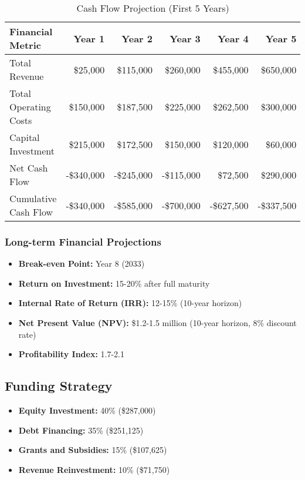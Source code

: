 \begin{table}[h]
\centering
\begin{tabular}{|l|r|r|r|r|r|}
\hline
\textbf{Financial Metric} & \textbf{Year 1} & \textbf{Year 2} & \textbf{Year 3} & \textbf{Year 4} & \textbf{Year 5} \\
\hline
Total Revenue & \$25,000 & \$115,000 & \$260,000 & \$455,000 & \$650,000 \\
Total Operating Costs & \$150,000 & \$187,500 & \$225,000 & \$262,500 & \$300,000 \\
Capital Investment & \$215,000 & \$172,500 & \$150,000 & \$120,000 & \$60,000 \\
\hline
Net Cash Flow & -\$340,000 & -\$245,000 & -\$115,000 & \$72,500 & \$290,000 \\
Cumulative Cash Flow & -\$340,000 & -\$585,000 & -\$700,000 & -\$627,500 & -\$337,500 \\
\hline
\end{tabular}
\caption{Cash Flow Projection (First 5 Years)}
\end{table}

\subsubsection{Long-term Financial Projections}
\begin{itemize}
    \item \textbf{Break-even Point:} Year 8 (2033)
    \item \textbf{Return on Investment:} 15-20\% after full maturity
    \item \textbf{Internal Rate of Return (IRR):} 12-15\% (10-year horizon)
    \item \textbf{Net Present Value (NPV):} \$1.2-1.5 million (10-year horizon, 8\% discount rate)
    \item \textbf{Profitability Index:} 1.7-2.1
\end{itemize}

\subsection{Funding Strategy}
\begin{itemize}
    \item \textbf{Equity Investment:} 40\% (\$287,000)
    \item \textbf{Debt Financing:} 35\% (\$251,125)
    \item \textbf{Grants and Subsidies:} 15\% (\$107,625)
    \item \textbf{Revenue Reinvestment:} 10\% (\$71,750)
\end{itemize}

